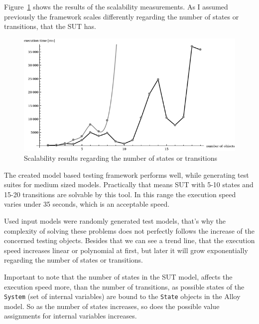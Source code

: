 Figure~\ref{fig:measurements_scalability} shows the results of the scalability measurements. As I assumed previously the framework scales differently regarding the number of states or transitions, that the SUT has.

\begin{figure}[htp]
\centering
\includegraphics[scale=0.5]{figures/measurements_scalability}
\caption{Scalability results regarding the number of states or transitions}
\label{fig:measurements_scalability}
\end{figure}

The created model based testing framework performs well, while generating test suites for medium sized models. Practically that means SUT with 5-10 states and 15-20 transitions are solvable by this tool. In this range the execution speed varies under 35 seconds, which is an acceptable speed.

Used input models were randomly generated test models, that's why the complexity of solving these problems does not perfectly follows the increase of the concerned testing objects. Besides that we can see a trend line, that the execution speed increases linear or polynomial at first, but later it will grow exponentially regarding the number of states or transitions.

Important to note that the number of states in the SUT model, affects the execution speed more, than the number of transitions, as possible states of the \texttt{System} (set of internal variables) are bound to the \texttt{State} objects in the Alloy model. So as the number of states increases, so does the possible value assignments for internal variables increases.


